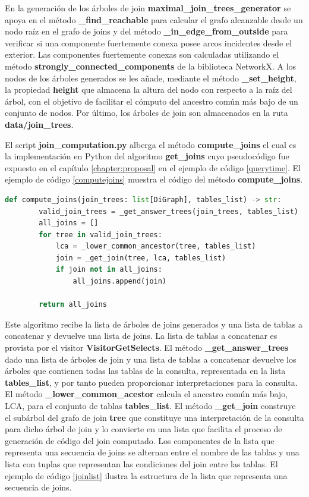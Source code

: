 En la generación de los \'arboles de join \textbf{maximal\_join\_trees\_generator} se apoya en 
el m\'etodo \textbf{\_find\_reachable} para calcular el grafo alcanzable desde un nodo ra\'iz en el grafo 
de joins y del m\'etodo \textbf{\_in\_edge\_from\_outside} para verificar si una componente fuertemente 
conexa posee arcos incidentes desde el exterior. Las componentes fuertemente conexas son calculadas 
utilizando el m\'etodo \textbf{strongly\_connected\_components} de la biblioteca NetworkX. A los nodos 
de los \'arboles generados se les añade, mediante el método \textbf{\_set\_height}, la propiedad \textbf{height} que almacena 
la altura del nodo con respecto a la raíz del \'arbol, con el objetivo de facilitar el c\'omputo 
del ancestro com\'un m\'as bajo de un conjunto de nodos. Por \'ultimo, 
los árboles de join son almacenados en la ruta \textbf{data/join\_trees}.


El script \textbf{join\_computation.py} alberga el m\'etodo \textbf{compute\_joins} el cual es la implementación 
en Python del algoritmo \textbf{get\_joins} cuyo pseudoc\'odigo fue expuesto en el capítulo \ref{chapter:proposal} 
en el ejemplo de c\'odigo \ref{querytime}. El ejemplo de c\'odigo \ref{computejoins} muestra el c\'odigo del 
m\'etodo \textbf{compute\_joins}.

\begin{lstlisting}[label={computejoins}, caption={C\'odigo del m\'etodo \textbf{compute\_joins}}, language={python}]
    def compute_joins(join_trees: list[DiGraph], tables_list) -> str:
        valid_join_trees = _get_answer_trees(join_trees, tables_list)
        all_joins = []
        for tree in valid_join_trees:
            lca = _lower_common_ancestor(tree, tables_list)
            join = _get_join(tree, lca, tables_list)
            if join not in all_joins:
                all_joins.append(join)

        return all_joins
\end{lstlisting}

Este algoritmo recibe la lista de \'arboles de joins generados y una 
lista de tablas a concatenar y devuelve una lista de joins. La lista de tablas a concatenar es provista por el 
visitor \textbf{VisitorGetSelects}. El m\'etodo \textbf{\_get\_answer\_trees} dado una lista de 
\'arboles de join y una lista de tablas a concatenar devuelve los \'arboles que contienen todas las tablas de 
la consulta, representada en la lista \textbf{tables\_list}, y por tanto pueden proporcionar interpretaciones 
para la consulta. El m\'etodo \textbf{\_lower\_common\_acestor} calcula el ancestro com\'un m\'as bajo, LCA, para el 
conjunto de tablas \textbf{tables\_list}. El m\'etodo \textbf{\_get\_join} construye el subárbol del grafo 
de join \textbf{tree} que constituye una interpretaci\'on de la consulta para dicho \'arbol de join y lo 
convierte en una lista que facilita el proceso de generación de c\'odigo del join computado. 
Los componentes de la lista que representa una secuencia de joins se alternan entre el nombre de las tablas 
y una lista con tuplas que representan las condiciones del join entre las tablas. El ejemplo de c\'odigo \ref{joinlist}
ilustra la estructura de la lista que representa una secuencia de joins.

